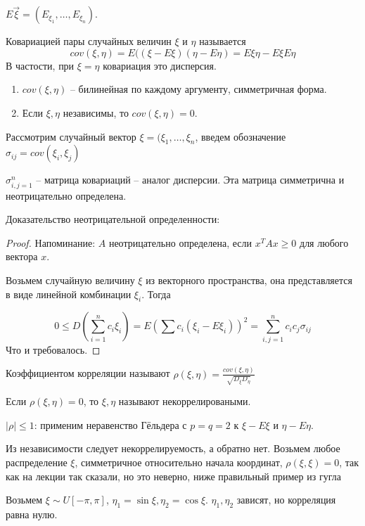 \begin{Def}
    $E{\vec{\xi}} = (E_{\xi_1}, \dots, E_{\xi_n})$.
\end{Def}
\begin{Def}
    Ковариацией пары случайных величин $\xi$ и $\eta$ называется $$cov(\xi, \eta) = E((\xi - E\xi)(\eta - E\eta) = E\xi\eta - E\xi E\eta$$ 
    В частости, при $\xi = \eta$ ковариация это дисперсия.
\end{Def}

\begin{theorem}
\begin{enumerate}
    \item $cov(\xi, \eta)$ -- билинейная по каждому аргументу, симметричная форма.
    \item Если $\xi, \eta$ независимы, то $cov(\xi, \eta) = 0$.
\end{enumerate}
\end{theorem}

\begin{Def}
    Рассмотрим случайный вектор $\xi = (\xi_1, \dots, \xi_n$, введем обозначение $\sigma_{ij} = cov(\xi_i, \xi_j)$

    $\sigma_{i,j=1}^n$ -- матрица ковариаций -- аналог дисперсии. Эта матрица симметрична и неотрицательно определена.
\end{Def}
Доказательство неотрицательной определенности:
\begin{proof}
Напоминание: $A$ неотрицательно определена, если $x^TAx \geq 0$ для любого вектора $x$. 

Возьмем случайную величину $\xi$ из векторного пространства, она представляется в виде линейной комбинации $\xi_i$. Тогда

$$0 \leq D(\sum\limits_{i = 1}^n c_i \xi_i) = E(\sum c_i (\xi_i - E \xi_i))^2 = \sum\limits_{i,j=1}^n c_i c_j \sigma_{ij}$$
Что и требовалось.
\end{proof}

\begin{Def}
    Коэффициентом корреляции называют $\rho(\xi, \eta) = \frac{cov(\xi, \eta)}{\sqrt{D_\xi D_\eta}}$
    
    Если $\rho(\xi, \eta) = 0$, то $\xi, \eta$ называют некоррелироваными.
\end{Def}
\begin{Rem}
    $|\rho| \leq 1$: применим неравенство Гёльдера с $p=q=2$ к $\xi - E\xi$ и $\eta - E\eta$.
\end{Rem}

\begin{Rem}
Из независимости следует некоррелируемость, а обратно нет.
Возьмем любое распределение $\xi$, симметричное относительно начала координат, $\rho(\xi, \xi) = 0$, так как \TODO на лекции так сказали, но это неверно, ниже правильный пример из гугла \TODO

Возьмем $\xi \sim U[-\pi, \pi]$, $\eta_1 = \sin \xi, \eta_2 = \cos \xi$. 
$\eta_1, \eta_2$ зависят, но корреляция равна нулю.
\end{Rem}                                                                                                                                         

